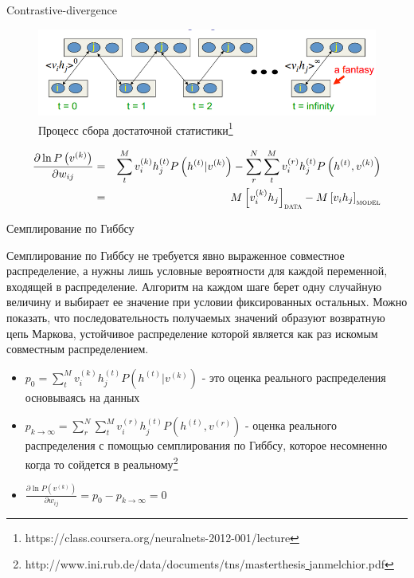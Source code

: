 \documentclass[10pt]{beamer}
\begin{document}
\begin{frame}{Contrastive-divergence}

\begin{figure}[h!]
  \centering
  \includegraphics[width=1\textwidth]{images/cd.png}
  \caption{Процесс сбора достаточной статистики\footnote{https://class.coursera.org/neuralnets-2012-001/lecture}}
\end{figure}

\begin{eqnarray*}
\frac{\partial \ln P\left(v^{(k)}\right)}{\partial w_{ij}} &=& \sum_t^M v_i^{(k)} h_j^{(t)} P\left( h^{(t)} | v^{(k)} \right) - \sum_r^N \sum_t^M v_i^{(r)} h_j^{(t)} P\left( h^{(t)}, v^{(k)} \right) \\
&=& M\left[v_i^{(k)} h_j \right]_{\textsc{data}} - M\left[v_i h_j\right]_{\textsc{model}}
\end{eqnarray*}

\end{frame}


\begin{frame}{Семплирование по Гиббсу}

Семплирование по Гиббсу не требуется явно выраженное совместное распределение, а нужны лишь условные вероятности для каждой переменной, входящей в распределение. Алгоритм на каждом шаге берет одну случайную величину и выбирает ее значение при условии фиксированных остальных. Можно показать, что последовательность получаемых значений образуют возвратную цепь Маркова, устойчивое распределение которой является как раз искомым совместным распределением.

\begin{itemize}
	\item $p_{0} = \sum_t^M v_i^{(k)} h_j^{(t)} P\left( h^{(t)} | v^{(k)} \right)$ - это оценка реального распределения основываясь на данных
	\item $p_{k \rightarrow \infty} = \sum_r^N \sum_t^M v_i^{(r)} h_j^{(t)} P\left( h^{(t)}, v^{(r)}\right)$ - оценка реального распределения с помощью семплирования по Гиббсу, которое несомненно когда то сойдется в реальному\footnote{http://www.ini.rub.de/data/documents/tns/masterthesis\underline{ }janmelchior.pdf}
	\item $\frac{\partial \ln P\left(v^{(k)}\right)}{\partial w_{ij}} = p_0 - p_{k \rightarrow \infty} = 0$
\end{itemize}

\end{frame}
\end{document}
